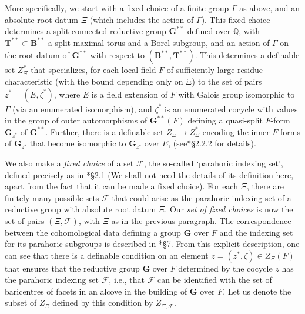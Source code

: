 \documentclass{amsart}
\newcommand{\Q}{{\mathbb Q}}
\newcommand{\cF}{\mathcal{F}}
\newcommand{\GL}{\mathbf {GL}}
\newcommand{\bG}{\mathbf{G}}
\newcommand{\bT}{\mathbf {T}}
\newcommand{\bB}{\mathbf {B}}
\theoremstyle{plain}
\theoremstyle{definition}
\begin{document}
More specifically, we start with a fixed choice  of a finite group $\Gamma$ as above, and an absolute root datum
$\Xi$ (which includes the action of $\Gamma$). This fixed choice determines  a split connected reductive group $\bG^{\ast\ast}$ defined over $\Q$,
with $\bT^{\ast\ast}\subset \bB^{\ast\ast}$ a split maximal torus and a Borel subgroup, and an action of $\Gamma$  on the root datum of $\bG^{\ast\ast}$
with respect to $(\bB^{\ast\ast}, \bT^{\ast\ast})$.  This determines a definable set $Z_{\Xi}^\ast$ that specializes,
for each local field $F$ of sufficiently large residue characteristic (with the bound depending only on $\Xi$)
to the set of pairs $z^\ast=(E, \zeta^\ast)$, where $E$ is a field extension of $F$ with Galois group isomorphic to 
$\Gamma$ (via an enumerated isomorphism), and $\zeta^\ast$ is an enumerated cocycle  with values in the group of outer automorphisms of $\bG^{\ast\ast}(F)$
defining a quasi-split $F$-form
$\bG_{z^\ast}$ of $\bG^{\ast\ast}$. Further, there is a definable set $Z_{\Xi}\to Z_{\Xi}^\ast$ encoding the inner $F$-forms of $\bG_{z^\ast}$ that become isomorphic to $\bG_{z^\ast}$ over $E$, (see\cite{gordon-hales:15a}*{\S 2.2.2} for details).


We also make a \emph{fixed choice} of a set $\cF$, the so-called `parahoric indexing set', defined precisely as in \cite{gordon-hales:15a}*{\S 2.1}
(We shall not need the details of its definition here, apart from the fact that it can be made a fixed choice).
For each $\Xi$, there are finitely many possible sets $\cF$ that could arise as the parahoric indexing set of a
reductive group with absolute root datum $\Xi$.
Our \emph{set of fixed choices} is now the set of pairs $(\Xi, \cF)$, with $\Xi$ as in the previous paragraph.
The correspondence between the cohomological data defining a group $\bG$ over $F$ and the indexing set for its
parahoric subgroups is described in \cite{gross:parahorics}*{\S 7}. From this explicit description, one can see that
there is a definable condition on an element $z=(z^\ast, \zeta)\in Z_\Xi(F)$ that ensures that
the reductive group $\bG$ over $F$ determined by the cocycle $z$ has the parahoric indexing set $\cF$, i.e.,
that $\cF$ can be identified with the set of baricentres of facets in an alcove in the building of $\bG$ over $F$.
Let us denote the subset of $Z_\Xi$ defined by this condition by $Z_{\Xi, \cF}$.
\end{document}
